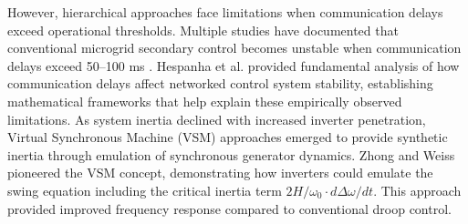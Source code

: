 \documentclass[12pt]{article}
\begin{document}
However, hierarchical approaches face limitations when communication delays exceed operational thresholds. Multiple studies have documented that conventional microgrid secondary control becomes unstable when communication delays exceed 50--100 ms \cite{guo2015,bidram2012,simpson2013}. Hespanha et al. \cite{hespanha2007} provided fundamental analysis of how communication delays affect networked control system stability, establishing mathematical frameworks that help explain these empirically observed limitations. As system inertia declined with increased inverter penetration, Virtual Synchronous Machine (VSM) approaches emerged to provide synthetic inertia through emulation of synchronous generator dynamics. Zhong and Weiss \cite{zhong2011} pioneered the VSM concept, demonstrating how inverters could emulate the swing equation including the critical inertia term $2H/\omega_0 \cdot d\Delta\omega/dt$. This approach provided improved frequency response compared to conventional droop control.
\end{document}
